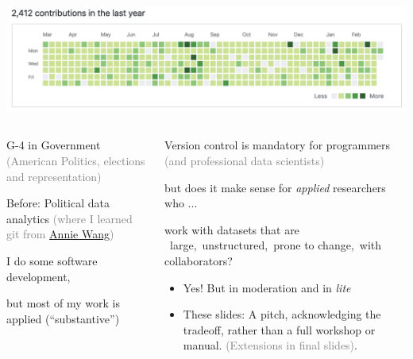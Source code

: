 \documentclass[ignorenonframetext,notes, 10pt, aspectratio=169]{beamer}
\begin{document}
\begin{frame}
\centering
\includegraphics[width = 0.9\linewidth]{portfolio.png}
\maketitle
\end{frame}



\begin{frame}{}

\begin{columns}[T]

\begin{column}{0.4\textwidth}
\begin{wideitemize}
\item G-4 in Government \textcolor{gray}{(American Politics, elections and representation)}
\item Before: Political data analytics \textcolor{gray}{(where I learned git from \href{https://anniejw.com/}{Annie Wang})}
\end{wideitemize}\pause
\bigskip
\begin{wideitemize}
\item I do some software development,
\item but most of my work is applied (``substantive'')
\end{wideitemize}
\end{column}\pause
\begin{column}{0.6\textwidth}
\begin{wideitemize}
\item Version control is mandatory for programmers \textcolor{gray}{(and professional data scientists)}\pause
\item but does it make sense for \emph{applied} researchers who ...
\item work with datasets that are \pause ~\alert{large},\pause ~\alert{unstructured},\pause ~\alert{prone to change},\pause ~\alert{with collaborators}?
\end{wideitemize}\pause

\bigskip
{}

\begin{tcolorbox}
\begin{itemize}
\item[{}] Yes! But in moderation and in \emph{lite}
\item[{}] These slides: A pitch, acknowledging the tradeoff, \pause rather than a full workshop or manual. \textcolor{gray}{(Extensions in final slides)}.
\end{itemize}
\end{tcolorbox}
\end{column}
\end{columns}
\end{frame}
\end{document}

